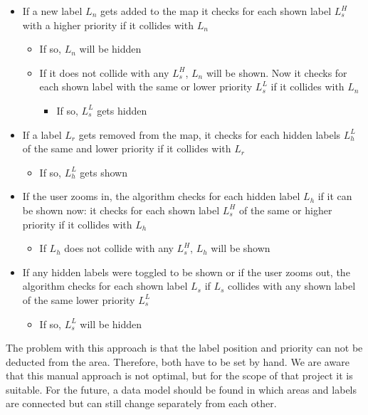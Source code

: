 \begin{itemize}
  \item If a new label $L_n$ gets added to the map it checks for each shown label $L_s^H$ with a higher priority if it collides with $L_n$
  \begin{itemize}
    \item If so, $L_n$ will be hidden
    \item If it does not collide with any $L_s^H$, $L_n$ will be shown. Now it checks for each shown label with the same or lower priority $L_s^L$ if it collides with $L_n$
    \begin{itemize}
      \item If so, $L_s^L$ gets hidden
    \end{itemize}
  \end{itemize}
  \item If a label $L_r$ gets removed from the map, it checks for each hidden labels $L_h^L$ of the same and lower priority if it collides with $L_r$
  \begin{itemize}
    \item If so, $L_h^L$ gets shown
  \end{itemize}
  \item If the user zooms in, the algorithm checks for each hidden label $L_h$ if it can be shown now: it checks for each shown label $L_s^H$ of the same or higher priority if it collides with $L_h$
  \begin{itemize}
    \item If $L_h$ does not collide with any $L_s^H$, $L_h$ will be shown
  \end{itemize}
  \item If any hidden labels were toggled to be shown or if the user zooms out, the algorithm checks for each shown label $L_s$ if $L_s$ collides with any shown label of the same lower priority $L_s^L$
  \begin{itemize}
    \item If so, $L_s^L$ will be hidden
  \end{itemize}

\end{itemize}

The problem with this approach is that the label position and priority can not be deducted from the area. Therefore, both have to be set by hand. We are aware that this manual approach is not optimal, but for the scope of that project it is suitable. For the future, a data model should be found in which areas and labels are connected but can still change separately from each other.

